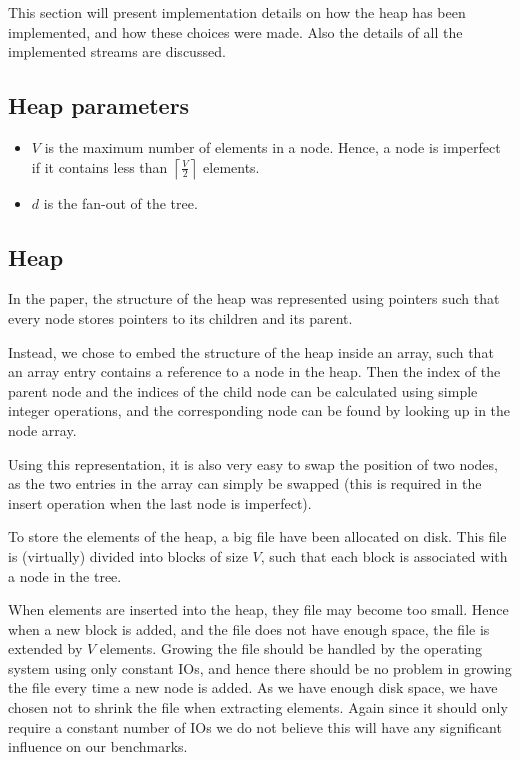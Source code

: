 This section will present implementation details on how the heap has
been implemented, and how these choices were made. Also the details of
all the implemented streams are discussed.

\subsection{Heap parameters}
\label{sec:implementation:parameters}
\begin{itemize}
  \item $V$ is the maximum number of elements in a node. Hence, a
    node is imperfect if it contains less than $\left\lceil \frac{V}{2}
    \right\rceil$ elements.
  \item $d$ is the fan-out of the tree.
\end{itemize}

\subsection{Heap}
In the paper, the structure of the heap was represented using pointers
such that every node stores pointers to its children and its
parent.

Instead, we chose to embed the structure of the heap
inside an array, such that an array entry contains a reference to a
node in the heap. Then the index of the parent node and the indices of
the child node can be calculated using simple integer operations, and
the corresponding node can be found by looking up in the node array.


Using this representation, it is also very easy to swap the position
of two nodes, as the two entries in the array can simply be swapped
(this is required in the insert operation when the last node is
imperfect).

To store the elements of the heap, a big file have been allocated on
disk. This file is (virtually) divided into blocks of size $V$, such
that each block is associated with a node in the tree.

When elements are inserted into the heap, they file may become too
small. Hence when a new block is added, and the file does not have
enough space, the file is extended by $V$ elements. Growing the file
should be handled by the operating system using only constant IOs, and
hence there should be no problem in growing the file every time a new
node is added. As we have enough disk space, we have chosen not to
shrink the file when extracting elements. Again since it should only
require a constant number of IOs we do not believe this will have any
significant influence on our benchmarks.

